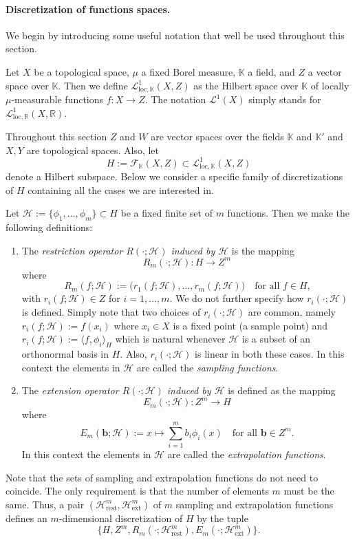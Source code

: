 \documentclass[a4paper]{article}
\newcommand{\R}{\mathbb{R}}
\newcommand{\cH}{\mathcal{H}}
\newcommand{\loc}{\text{loc}}
\newcommand{\bb}{\boldsymbol{b}}
\newcommand{\cF}{\mathcal{F}}
\newcommand{\cL}{\mathcal{L}}
\newcommand{\K}{\mathbb{K}}
\newcommand{\ext}{\text{ext}}
\newcommand{\rest}{\text{rest}}
\newcommand{\ip}[2]{\langle #1,#2 \rangle}
\begin{document}
\paragraph{Discretization of functions spaces.}
We begin by introducing some useful notation that well be used 
throughout this section.
\begin{Not}
  Let $X$ be a topological space, $\mu$ a fixed 
  Borel measure, $\K$ a field, and $Z$ a vector space over $\K$. 
  Then we define $\cL^1_{\loc,\K}(X,Z)$ as the Hilbert space over $\K$ of
  locally $\mu$-measurable functions 
  $f\colon X\to Z$. The notation $\cL^1(X)$ simply stands for 
  $\cL^1_{\loc,\R}(X,\R)$.
\end{Not}  
Throughout this section $Z$ and $W$ are vector spaces over the 
fields $\K$ and $\K'$ and $X, Y$ are topological spaces.
Also, let
\[ H:=\cF_{\K}(X,Z)\subset \cL^1_{\loc,\K}(X,Z) \]
denote a  Hilbert subspace. Below we consider a specific family of 
discretizations of $H$  containing all the cases we are 
interested in. 
\begin{Def}
  Let $\cH:=\{ \phi_{1},\ldots,\phi_{m} \}\subset H$ be a 
  fixed finite set of $m$ functions.
  Then we make the following definitions:
  \begin{enumerate}
  \item The \emph{restriction operator $R(\cdot;\cH)$ induced by 
    $\cH$} is the  mapping  
    \[ R_{m}(\cdot;\cH) \colon H \to Z^m \]
    where 
    \[ R_{m}(f;\cH):=\bigl( r_{1}(f;\cH),\ldots,r_{m}(f;\cH) \bigr) 
       \quad\text{for all $f\in H$,} \]
    with $r_{i}(f;\cH)\in Z$ for $i=1,\ldots,m$.
    We do not further specify how $r_{i}(\cdot;\cH)$ is defined.
    Simply note that two choices of $r_{i}(\cdot;\cH)$ are common, namely
    $r_{i}(f;\cH):=f(x_{i})$ where $x_{i}\in X$ is a fixed point (a sample 
    point) and $r_{i}(f;\cH):=\ip{f}{\phi_{i}}_{H}$ which is natural whenever
    $\cH$ is a subset of an orthonormal basis in $H$. Also, 
    $r_{i}(\cdot;\cH)$ is linear in both these cases.
    In this context the elements in $\cH$ are called the 
    \emph{sampling functions}.
  \item The \emph{extension operator $R(\cdot;\cH)$ induced by 
    $\cH$} is defined as the mapping  
    \[ E_{m}(\cdot;\cH) \colon Z^m \to H \]
    where 
    \[ E_{m}(\bb;\cH):= x\mapsto \sum_{i=1}^m b_{i}\phi_{i}(x)
       \quad\text{for all $\bb\in Z^m$.} \]
    In this context the elements in $\cH$ are called the 
    \emph{extrapolation functions}.       
  \end{enumerate}
\end{Def}
Note that the sets of sampling and extrapolation functions do not 
need to coincide.  The only requirement is that the number of 
elements $m$ must be the same. Thus, a pair 
$(\cH^m_{\rest},\cH^m_{\ext})$ of $m$ 
sampling and extrapolation functions defines an $m$-dimensional 
discretization of $H$ by the tuple
\[ \bigl\{
     H,Z^m,R_{m}(\cdot;\cH^m_{\rest}),E_{m}(\cdot;\cH^m_{\ext})
   \bigr\}. \]
   
\end{document}
